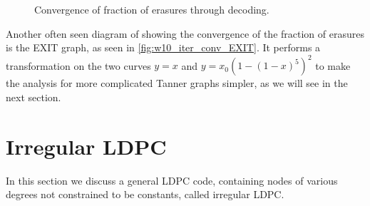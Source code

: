 \begin{figure}[H]
    \centering
    \hspace{0.1cm}
    \caption{Convergence of fraction of erasures through decoding.}
    \label{fig:w10_iter_conv}
\end{figure}

Another often seen diagram of showing the convergence of the fraction of erasures is the EXIT graph, as seen in \autoref{fig:w10_iter_conv_EXIT}. It performs a transformation on the two curves $y=x$ and $y=x_0(1-(1-x)^5)^2$ to make the analysis for more complicated Tanner graphs simpler, as we will see in the next section.

\section{Irregular LDPC}
In this section we discuss a general LDPC code, containing nodes of various degrees not constrained to be constants, called irregular LDPC.

